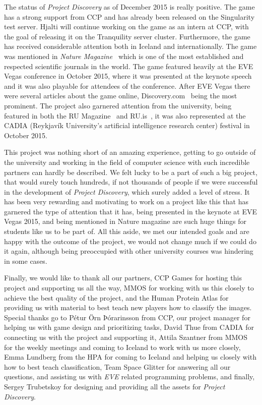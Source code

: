 The status of \emph{Project Discovery} as of December 2015 is really positive. The game has a strong support from CCP and has already been released on the Singularity test server. Hjalti will continue working on the game as an intern at CCP, with the goal of releasing it on the Tranquility server cluster. Furthermore, the game has received considerable attention both in Iceland and internationally. The game was mentioned in \emph{Nature Magazine}~\cite{nature} which is one of the most established and respected scientific journals in the world. The game featured heavily at the EVE Vegas conference in October 2015, where it was presented at the keynote speech and it was also playable for attendees of the conference. After EVE Vegas there were several articles about the game online, Discovery.com~\cite{discovery} being the most prominent. The project also garnered attention from the university, being featured in both the RU Magazine~\cite{rumag} and RU.is~\cite{ruis}, it was also represented at the CADIA (Reykjavík University's artificial intelligence research center) festival in October 2015. 

This project was nothing short of an amazing experience, getting to go outside of the university and working in the field of computer science with such incredible partners can hardly be described. We felt lucky to be a part of such a big project, that would surely touch hundreds, if not thousands of people if we were successful in the development of \emph{Project Discovery}, which surely added a level of stress. It has been very rewarding and motivating to work on a project like this that has garnered the type of attention that it has, being presented in the keynote at EVE Vegas 2015, and being mentioned in Nature magazine are such huge things for students like us to be part of. All this aside, we met our intended goals and are happy with the outcome of the project, we would not change much if we could do it again, although being preoccupied with other university courses was hindering in some cases.

Finally, we would like to thank all our partners, CCP Games for hosting this project and supporting us all the way, MMOS for working with us this closely to achieve the best quality of the project, and the Human Protein Atlas for providing us with material to best teach new players how to classify the images. Special thanks go to Pétur Örn Þórarinsson from CCP, our project manager for helping us with game design and prioritizing tasks, David Thue from CADIA for connecting us with the project and supporting it, Attila Szantner from MMOS for the weekly meetings and coming to Iceland to work with us more closely, Emma Lundberg from the HPA for coming to Iceland and helping us closely with how to best teach classification, Team Space Glitter for answering all our questions, and assisting us with \emph{EVE} related programming problems, and finally, Sergey Trubetskoy for designing and providing all the assets for \emph{Project Discovery}.

